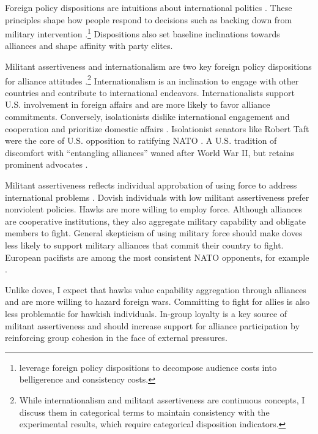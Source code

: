 \documentclass[12pt]{article}
\begin{document}
Foreign policy dispositions are intuitions about international politics \citep{KertzerTingley2018}. 
These principles shape how people respond to decisions such as backing down from military intervention \citep{KertzerBrutger2016}.\footnote{\citet{KertzerBrutger2016} leverage foreign policy dispositions to decompose audience costs into belligerence and consistency costs.}
Dispositions also set baseline inclinations towards alliances and shape affinity with party elites.


Militant assertiveness and internationalism are two key foreign policy dispositions for alliance attitudes \citep{Herrmannetal1999}.\footnote{While internationalism and militant assertiveness are continuous concepts, I discuss them in categorical terms to maintain consistency with the experimental results, which require categorical disposition indicators.}
Internationalism is an inclination to engage with other countries and contribute to international endeavors. 
Internationalists support U.S. involvement in foreign affairs and are more likely to favor alliance commitments. 
Conversely, isolationists dislike international engagement and cooperation and prioritize domestic affairs \citep{Kertzer2013}. 
Isolationist senators like Robert Taft were the core of U.S. opposition to ratifying NATO \citep{Kaplan2007}.
A U.S. tradition of discomfort with ``entangling alliances'' waned after World War II, but retains prominent advocates \citep{Kupchan2020}.


Militant assertiveness reflects individual approbation of using force to address international problems \citep{Herrmannetal1999}. 
Dovish individuals with low militant assertiveness prefer nonviolent policies.
Hawks are more willing to employ force.
Although alliances are cooperative institutions, they also aggregate military capability and obligate members to fight.
General skepticism of using military force should make doves less likely to support military alliances that commit their country to fight.  
European pacifists are among the most consistent NATO opponents, for example \citep{Thies2015}.


Unlike doves, I expect that hawks value capability aggregation through alliances and are more willing to hazard foreign wars. 
Committing to fight for allies is also less problematic for hawkish individuals. 
In-group loyalty is a key source of militant assertiveness \citep{Kertzeretal2014} and should increase support for alliance participation by reinforcing group cohesion in the face of external pressures.
\end{document}

